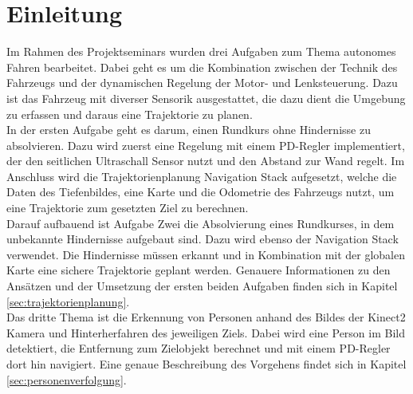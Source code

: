 \section{Einleitung}
\label{sec:einleitung}
Im Rahmen des Projektseminars wurden drei Aufgaben zum Thema autonomes Fahren bearbeitet. Dabei geht es um die Kombination zwischen der Technik des Fahrzeugs und der dynamischen Regelung der Motor- und Lenksteuerung. Dazu ist das Fahrzeug mit diverser Sensorik ausgestattet, die dazu dient die Umgebung zu erfassen und daraus eine Trajektorie zu planen. \\
In der ersten Aufgabe geht es darum, einen Rundkurs ohne Hindernisse zu absolvieren. Dazu wird zuerst eine Regelung mit einem PD-Regler implementiert, der den seitlichen Ultraschall Sensor nutzt und den Abstand zur Wand regelt. Im Anschluss wird die Trajektorienplanung Navigation Stack aufgesetzt, welche die Daten des Tiefenbildes, eine Karte und die Odometrie des Fahrzeugs nutzt, um eine Trajektorie zum gesetzten Ziel zu berechnen.\\
Darauf aufbauend ist Aufgabe Zwei die Absolvierung eines Rundkurses, in dem unbekannte Hindernisse aufgebaut sind. Dazu wird ebenso der Navigation Stack verwendet. Die Hindernisse m\"ussen erkannt und in Kombination mit der globalen Karte eine sichere Trajektorie geplant werden. Genauere Informationen zu den Ans\"atzen und der Umsetzung der ersten beiden Aufgaben finden sich in Kapitel \ref{sec:trajektorienplanung}.\\
Das dritte Thema ist die Erkennung von Personen anhand des Bildes der Kinect2 Kamera und Hinterherfahren des jeweiligen Ziels. Dabei wird eine Person im Bild detektiert, die Entfernung zum Zielobjekt berechnet und mit einem PD-Regler dort hin navigiert. Eine genaue Beschreibung des Vorgehens findet sich in Kapitel \ref{sec:personenverfolgung}.